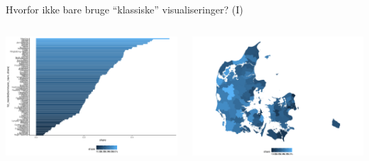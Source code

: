 \documentclass[
  8pt,
  ignorenonframetext,
  aspectratio=169]{beamer}
\newcommand{\columnsbegin}{\begin{columns}}
\newcommand{\columnsend}{\end{columns}}
\begin{document}
\begin{frame}{Hvorfor ikke bare bruge ``klassiske'' visualiseringer?
(I)}
\protect\hypertarget{hvorfor-ikke-bare-bruge-klassiske-visualiseringer-i}{}
\columnsbegin
{}

\tiny

\includegraphics[width=1\linewidth]{crashcourse_slides_files/figure-beamer/unnamed-chunk-2-1}

\normalsize


\tiny

\includegraphics[width=1\linewidth]{crashcourse_slides_files/figure-beamer/unnamed-chunk-3-1}

\normalsize

\columnsend
\end{frame}
\end{document}
